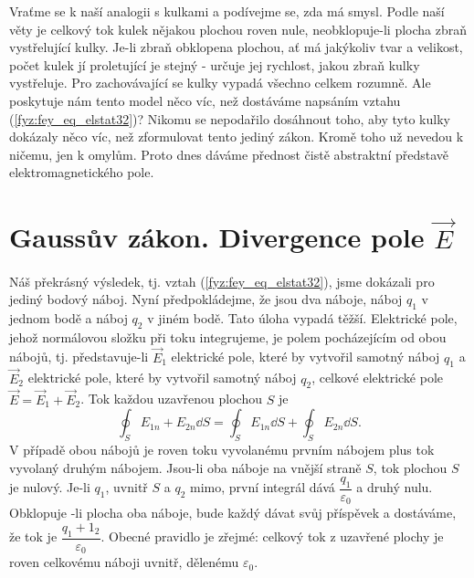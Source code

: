 {    Vraťme se k naší analogii s kulkami a podívejme se, zda má smysl. Podle naší věty je celkový 
    tok kulek nějakou plochou roven nule, neobklopuje-li plocha zbraň vystřelující kulky. Je-li 
    zbraň obklopena plochou, ať má jakýkoliv tvar a velikost, počet kulek jí proletující je stejný 
    - určuje jej rychlost, jakou zbraň kulky vystřeluje. Pro zachovávající se kulky vypadá všechno 
    celkem rozumně. Ale poskytuje nám tento model něco víc, než dostáváme napsáním vztahu 
    (\ref{fyz:fey_eq_elstat32})? Nikomu se nepodařilo dosáhnout toho, aby tyto kulky dokázaly něco 
    víc, než zformulovat tento jediný zákon. Kromě toho už nevedou k ničemu, jen k omylům. Proto 
    dnes dáváme přednost čistě abstraktní představě elektromagnetického pole.

  \section{Gaussův zákon. Divergence pole \texorpdfstring{\(\vec{E}\)}{E}}\label{fyz:IIchapIVsecVI}
    \cite[s.~75]{Feynman02} Náš překrásný výsledek, tj. vztah (\ref{fyz:fey_eq_elstat32}), jsme 
    dokázali pro jediný bodový náboj. Nyní předpokládejme, že jsou dva náboje, náboj \(q_1\) v 
    jednom bodě a náboj \(q_2\) v jiném bodě. Tato úloha vypadá těžší. Elektrické pole, jehož 
    normálovou složku při toku integrujeme, je polem pocházejícím od obou nábojů, tj. 
    představuje-li \(\vec{E}_1\) elektrické pole, které by vytvořil samotný náboj \(q_1\) a 
    \(\vec{E}_2\) elektrické pole, které by vytvořil samotný náboj \(q_2\), celkové elektrické pole 
    \(\vec{E}=\vec{E}_1 + \vec{E}_2\). Tok každou uzavřenou plochou \(S\) je
    \begin{equation}\label{fyz:fey_eq_elstat33}
     \oint_S E_{1n} + E_{2n}\dd{S} = \oint_S E_{1n}\dd{S} + \oint_S E_{2n}\dd{S}.
    \end{equation}
    V případě obou nábojů je roven toku vyvolanému prvním nábojem plus tok vyvolaný druhým nábojem. 
    Jsou-li oba náboje na vnější straně \(S\), tok plochou \(S\) je nulový. Je-li \(q_1\), uvnitř 
    \(S\) a \(q_2\) mimo, první integrál dává \(\dfrac{q_1}{\varepsilon_0}\) a druhý nulu. 
    Obklopuje -li plocha oba náboje, bude každý dávat svůj příspěvek a dostáváme, že tok je 
    \(\dfrac{q_1+1_2}{\varepsilon_0}\). Obecné pravidlo je zřejmé: celkový tok z uzavřené plochy je 
    roven celkovému náboji uvnitř, dělenému \(\varepsilon_0\).
    
}
